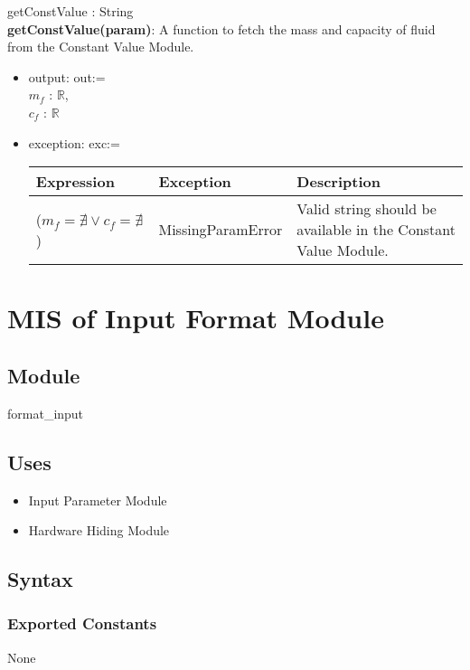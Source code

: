 \documentclass[12pt, titlepage]{article}
\begin{document}
getConstValue : String  \\ 
\textbf{getConstValue(param)}:  A function to fetch the mass and capacity of fluid from the Constant Value Module. 
\begin{itemize}
    \item  output: out:= \\ $m_f$ : $\mathbb{R}$,  \\ $c_f$ : $\mathbb{R}$
    \item  exception: exc:= \\

 \begin{tabular}{p{5cm} p{3.5cm} p{5.5cm}}
 \hline
 \textbf{Expression} & \textbf{Exception} & \textbf{Description} \\
  \hline
    ($m_f = \nexists \vee c_f = \nexists $) & MissingParamError & Valid string should be available in the Constant Value Module.  \\
    \hline
 \end{tabular}
\end{itemize}

\newpage

\section{MIS of Input Format Module} \label{Input_Format_Module} 

\subsection{Module}

format\_input 

\subsection{Uses}

\begin{itemize}
    \item Input Parameter Module
    \item Hardware Hiding Module
\end{itemize}

\subsection{Syntax}

\subsubsection{Exported Constants}
None 
\end{document}
